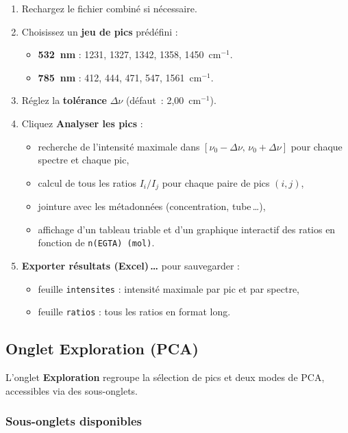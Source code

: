 \documentclass[12pt, a4paper]{article}
\newcommand{\cm}{cm$^{-1}$}
\begin{document}
\begin{enumerate}
  \item Rechargez le fichier combiné si nécessaire.
  \item Choisissez un \textbf{jeu de pics} prédéfini :
    \begin{itemize}
      \item \textbf{532~nm} : 1231, 1327, 1342, 1358, 1450~\cm.
      \item \textbf{785~nm} : 412, 444, 471, 547, 1561~\cm.
    \end{itemize}
  \item Réglez la \textbf{tolérance} $\Delta\nu$ (défaut~: 2{,}00~\cm).
  \item Cliquez \textbf{Analyser les pics} :
    \begin{itemize}
      \item recherche de l'intensité maximale dans $[\nu_0 - \Delta\nu,\,
            \nu_0 + \Delta\nu]$ pour chaque spectre et chaque pic,
      \item calcul de tous les ratios $I_i / I_j$ pour chaque paire de pics
            $(i, j)$,
      \item jointure avec les métadonnées (concentration, tube\,\ldots),
      \item affichage d'un tableau triable et d'un graphique interactif des
            ratios en fonction de \texttt{n(EGTA) (mol)}.
    \end{itemize}
  \item \textbf{Exporter résultats (Excel)\,\ldots} pour sauvegarder :
    \begin{itemize}
      \item feuille \texttt{intensites} : intensité maximale par pic et par
            spectre,
      \item feuille \texttt{ratios} : tous les ratios en format long.
    \end{itemize}
\end{enumerate}

\subsection{Onglet Exploration (PCA)}

L'onglet \textbf{Exploration} regroupe la sélection de pics et deux modes de
PCA, accessibles via des sous-onglets.

\subsubsection{Sous-onglets disponibles}
\end{document}
